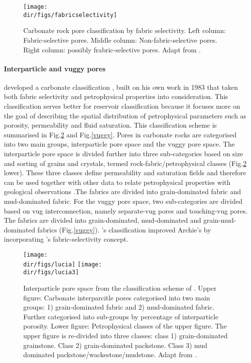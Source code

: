 \begin{figure}[htbp]
  \centering
  \texttt{[image: \\dir/figs/fabricselectivity]}
  \caption{Carbonate rock pore classification by fabric selectivity. Left column: Fabric-selective pores. Middle column: Non-fabric-selective pores. Right column: possibly frabric-selective pores. Adapt from \citep{akbar1995classic}.}
  \label{fabricselectivity}
\end{figure}

\paragraph{Interparticle and vuggy pores}
\citet{lucia1995rock} developed a carbonate classification , built on his own work in 1983 \citep{lucia1983petrophysical} that taken both fabric selectivity and petrophysical properties into consideration. This classification serves better for reservoir classification because it focuses more on the goal of describing the spatial distribution of petrophysical parameters such as porosity, permeability and fluid saturation. This classification scheme is summarised in Fig.\ref{interparticle} and Fig.\ref{vuggy}. Pores in carbonate rocks are categorised into two main groups, interparticle pore space and the vuggy pore space. The interparticle pore space is divided further into three sub-categories based on size and sorting of grains and crystals, termed rock-fabric/petrophysical classes (Fig.\ref{interparticle} lower). These three classes define permeability and saturation fields and therefore can be used together with other data to relate petrophysical properties with geological observations \citep{lucia1995rock}.The fabrics are divided into grain-dominated fabric and mud-dominated fabric. For the vuggy pore space, two sub-categories are divided based on vug interconnection, namely separate-vug pores and touching-vug pores. The fabrics are divided into grain-dominated, mud-dominated and grain-mud-dominated fabrics (Fig.\ref{vuggy}). \citet{lucia1995rock}'s classification improved Archie's \citep{archie1952classification} by incorporating \citep{choquette1970geologic}'s fabric-selectivity concept.

\begin{figure}[htbp]
  \centering
  \texttt{[image: \\dir/figs/lucia]}
  \texttt{[image: \\dir/figs/lucia3]}
  \caption{Interparticle pore space from the classification scheme of \citet{lucia1995rock}. Upper figure: Carbonate interparcitle pores categorised into two main groups: 1) grain-dominated fabric and 2) mud-dominated fabric. Further categorised into sub-groups by percentage of interparticle porosity. Lower figure: Petrophysical classes of the upper figure. The upper figure is re-divided into three classes: class 1) grain-dominated grainstone. Class 2) grain-dominated packstone. Class 3) mud dominated packstone/wackestone/mudstone. Adapt from \citep{lucia1995rock}.}
  \label{interparticle}
\end{figure}

